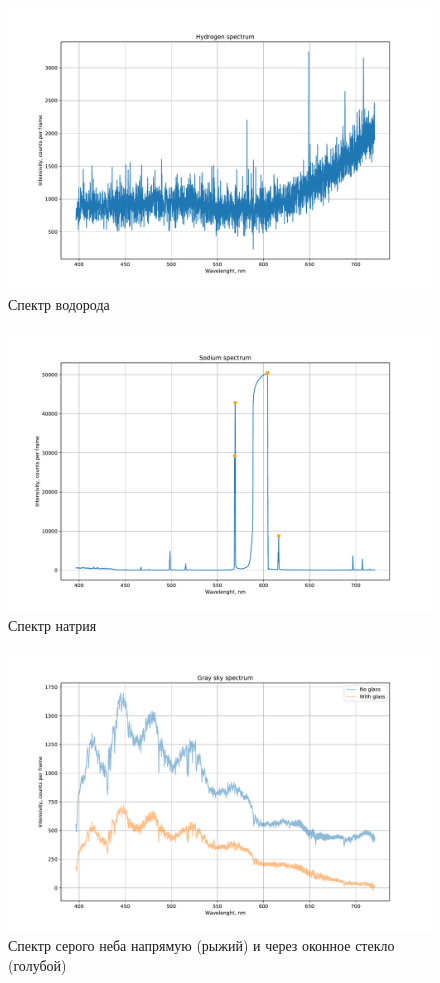 \documentclass[a4paper, 12pt]{article}
\begin{document}
\begin{figure}[H]
	\centering
	\includegraphics[width=0.9\linewidth]{h2}
	\caption{Спектр водорода}
	\label{fig:h2}
\end{figure}

\begin{figure}[H]
	\centering
	\includegraphics[width=0.9\linewidth]{na}
	\caption{Спектр натрия}
	\label{fig:na}
\end{figure}


\begin{figure}[H]
	\centering
	\includegraphics[width=0.9\linewidth]{sky_spectrum}
	\caption{Спектр серого неба напрямую (рыжий) и через оконное стекло (голубой)}
	\label{fig:sky}
\end{figure}
\end{document}
